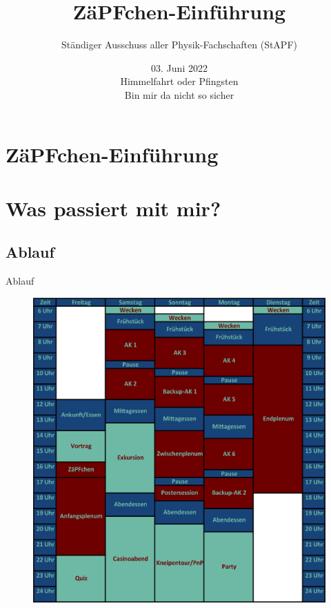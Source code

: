 \documentclass[compress,]{beamer}
\title[ZäPFchen-Einführung]{ZäPFchen-Einführung}
\author{Ständiger Ausschuss aller Physik-Fachschaften (StAPF)}
\institute[Zusammenkunft aller Physik-Fachschaften]
\date{03. Juni 2022\\Himmelfahrt oder Pfingsten\\Bin mir da nicht so sicher}
\begin{document}
\begin{frame}
  \titlepage

\end{frame}

\section{ZäPFchen-Einführung}



\section{Was passiert mit mir?}

\subsection{Ablauf}

\begin{frame}{Ablauf}

  \begin{figure}
    \centering
    \includegraphics[height=0.9\textheight]{ZeitplanBochumFinal.png}

  \end{figure}

\end{frame}
\end{document}
